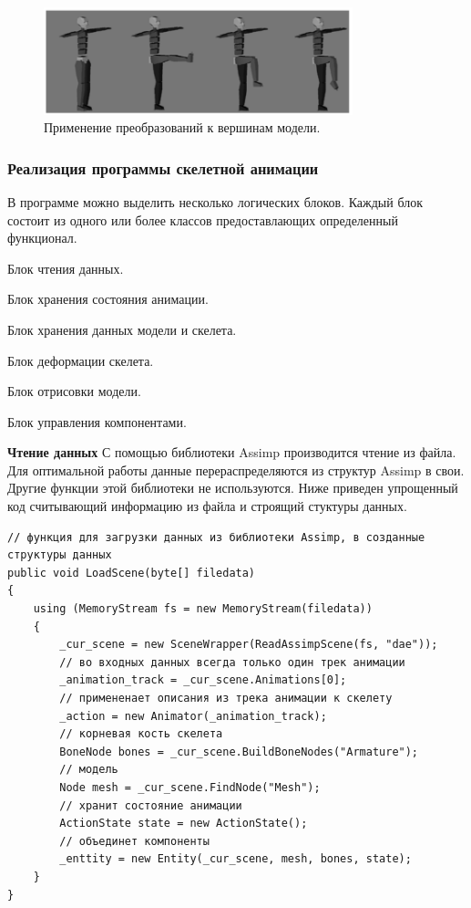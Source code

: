 \begin{figure}[h!]
    \centering
    \includegraphics[width=0.8\textwidth]{forward_kinematics.png}
    \caption{\small{Применение преобразований к вершинам модели.}}

\end{figure}



\subsubsection{Реализация программы скелетной анимации}
В программе можно выделить несколько логических блоков. Каждый блок состоит из одного или более классов предоставлающих определенный функционал.

\begin{my_enumerate}
\item Блок чтения данных.
\item Блок хранения состояния анимации.
\item Блок хранения данных модели и скелета.
\item Блок деформации скелета.
\item Блок отрисовки модели.
\item Блок управления компонентами.
\end{my_enumerate}

\textbf{Чтение данных}
С помощью библиотеки Assimp производится чтение из файла. Для оптимальной работы данные перераспределяются из структур Assimp в свои. Другие функции этой библиотеки не используются.
Ниже приведен упрощенный код считывающий информацию из файла и строящий стуктуры данных.

\begin{verbatim}
// функция для загрузки данных из библиотеки Assimp, в созданные структуры данных
public void LoadScene(byte[] filedata)
{
    using (MemoryStream fs = new MemoryStream(filedata))
    {
        _cur_scene = new SceneWrapper(ReadAssimpScene(fs, "dae"));
        // во входных данных всегда только один трек анимации
        _animation_track = _cur_scene.Animations[0];
        // примененает описания из трека анимации к скелету
        _action = new Animator(_animation_track);
        // корневая кость скелета
        BoneNode bones = _cur_scene.BuildBoneNodes("Armature");
        // модель
        Node mesh = _cur_scene.FindNode("Mesh");
        // хранит состояние анимации
        ActionState state = new ActionState();
        // объединет компоненты
        _enttity = new Entity(_cur_scene, mesh, bones, state);
    }
}
\end{verbatim}



